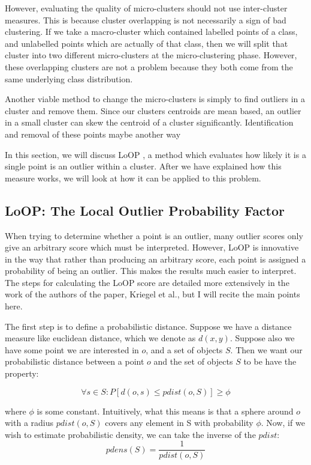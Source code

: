 \documentclass[12pt,a4paper,oneside]{report}
\begin{document}
However, evaluating the quality of micro-clusters should not use inter-cluster measures. This is because cluster overlapping is not necessarily a sign of bad clustering. If we take a macro-cluster which contained labelled points of a class, and unlabelled points which are actually of that class, then we will split that cluster into two different micro-clusters at the micro-clustering phase. However, these overlapping clusters are not a problem because they both come from the same underlying class distribution. 

Another viable method to change the micro-clusters is simply to find outliers in a cluster and remove them. Since our clusters centroids are mean based, an outlier in a small cluster can skew the centroid of a cluster significantly. Identification and removal of these points maybe another way 

In this section, we will discuss LoOP \cite{Loop}, a method which evaluates how likely it is a single point is an outlier within a cluster. After we have explained how this measure works, we will look at how it can be applied to this problem. 

\subsection*{LoOP: The Local Outlier Probability Factor}

When trying to determine whether a point is an outlier, many outlier scores only give an arbitrary score which must be interpreted. However, LoOP is innovative in the way that rather than producing an arbitrary score, each point is assigned a probability of being an outlier. This makes the results much easier to interpret. The steps for calculating the LoOP score are detailed more extensively in the work of the authors of the paper, Kriegel et al.\cite{LoOP}, but I will recite the main points here.  

The first step is to define a probabilistic distance. Suppose we have a distance measure like euclidean distance, which we denote as $d(x,y)$. Suppose also we have some point we are interested in $o$, and a set of objects $S$. Then we want our probabilistic distance between a point $o$ and the set of objects $S$ to be have the property:

\[\forall s \in S: P[d(o,s) \leq pdist(o,S)] \geq \phi\]  

where $\phi$ is some constant. Intuitively, what this means is that a sphere around $o$ with a radius $pdist(o,S)$ covers any element in S with probability $\phi$. Now, if we wish to estimate probabilistic density, we can take the inverse of the $pdist$:
\[pdens(S) = \frac{1}{pdist(o,S)}\]
\end{document}
